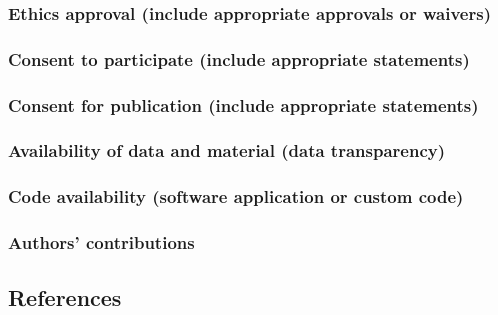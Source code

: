 \documentclass[
  11pt,
]{article}
\begin{document}
\hypertarget{ethics-approval-include-appropriate-approvals-or-waivers}{%
\subsubsection{Ethics approval (include appropriate approvals or waivers)}\label{ethics-approval-include-appropriate-approvals-or-waivers}}

\hypertarget{consent-to-participate-include-appropriate-statements}{%
\subsubsection{Consent to participate (include appropriate statements)}\label{consent-to-participate-include-appropriate-statements}}

\hypertarget{consent-for-publication-include-appropriate-statements}{%
\subsubsection{Consent for publication (include appropriate statements)}\label{consent-for-publication-include-appropriate-statements}}

\hypertarget{availability-of-data-and-material-data-transparency}{%
\subsubsection{Availability of data and material (data transparency)}\label{availability-of-data-and-material-data-transparency}}

\hypertarget{code-availability-software-application-or-custom-code}{%
\subsubsection{Code availability (software application or custom code)}\label{code-availability-software-application-or-custom-code}}

\hypertarget{authors-contributions}{%
\subsubsection{Authors' contributions}\label{authors-contributions}}

\hypertarget{references}{%
\subsection{References}\label{references}}
\end{document}
